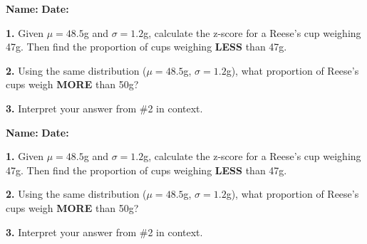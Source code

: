 \documentclass[11pt]{article}
\begin{document}
\newpage

\begin{tcolorbox}[colback=blue!5!white,colframe=blue!75!black,title=Exit Ticket: Z-Scores to Proportions]
\textbf{Name:} \underline{\hspace{3in}} \textbf{Date:} \underline{\hspace{1in}}

\vspace{0.1in}

\textbf{1.} Given $\mu = 48.5$g and $\sigma = 1.2$g, calculate the z-score for a Reese's cup weighing 47g. Then find the proportion of cups weighing \textbf{LESS} than 47g.

\vspace{0.4in}

\textbf{2.} Using the same distribution ($\mu = 48.5$g, $\sigma = 1.2$g), what proportion of Reese's cups weigh \textbf{MORE} than 50g?

\vspace{0.4in}

\textbf{3.} Interpret your answer from \#2 in context.

\vspace{0.4in}

\end{tcolorbox}

\vspace{0.1in}

\begin{tcolorbox}[colback=blue!5!white,colframe=blue!75!black,title=Exit Ticket: Z-Scores to Proportions]
\textbf{Name:} \underline{\hspace{3in}} \textbf{Date:} \underline{\hspace{1in}}

\vspace{0.1in}

\textbf{1.} Given $\mu = 48.5$g and $\sigma = 1.2$g, calculate the z-score for a Reese's cup weighing 47g. Then find the proportion of cups weighing \textbf{LESS} than 47g.

\vspace{0.4in}

\textbf{2.} Using the same distribution ($\mu = 48.5$g, $\sigma = 1.2$g), what proportion of Reese's cups weigh \textbf{MORE} than 50g?

\vspace{0.4in}

\textbf{3.} Interpret your answer from \#2 in context.

\vspace{0.4in}

\end{tcolorbox}
\end{document}
